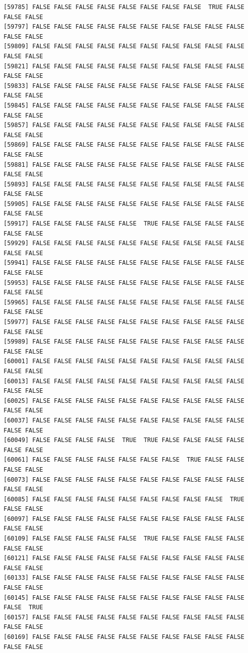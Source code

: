 \documentclass[
  a4paper,
  DIV=11,
  numbers=noendperiod]{scrartcl}
\begin{document}
\begin{verbatim}
[59785] FALSE FALSE FALSE FALSE FALSE FALSE FALSE FALSE  TRUE FALSE FALSE FALSE
[59797] FALSE FALSE FALSE FALSE FALSE FALSE FALSE FALSE FALSE FALSE FALSE FALSE
[59809] FALSE FALSE FALSE FALSE FALSE FALSE FALSE FALSE FALSE FALSE FALSE FALSE
[59821] FALSE FALSE FALSE FALSE FALSE FALSE FALSE FALSE FALSE FALSE FALSE FALSE
[59833] FALSE FALSE FALSE FALSE FALSE FALSE FALSE FALSE FALSE FALSE FALSE FALSE
[59845] FALSE FALSE FALSE FALSE FALSE FALSE FALSE FALSE FALSE FALSE FALSE FALSE
[59857] FALSE FALSE FALSE FALSE FALSE FALSE FALSE FALSE FALSE FALSE FALSE FALSE
[59869] FALSE FALSE FALSE FALSE FALSE FALSE FALSE FALSE FALSE FALSE FALSE FALSE
[59881] FALSE FALSE FALSE FALSE FALSE FALSE FALSE FALSE FALSE FALSE FALSE FALSE
[59893] FALSE FALSE FALSE FALSE FALSE FALSE FALSE FALSE FALSE FALSE FALSE FALSE
[59905] FALSE FALSE FALSE FALSE FALSE FALSE FALSE FALSE FALSE FALSE FALSE FALSE
[59917] FALSE FALSE FALSE FALSE FALSE  TRUE FALSE FALSE FALSE FALSE FALSE FALSE
[59929] FALSE FALSE FALSE FALSE FALSE FALSE FALSE FALSE FALSE FALSE FALSE FALSE
[59941] FALSE FALSE FALSE FALSE FALSE FALSE FALSE FALSE FALSE FALSE FALSE FALSE
[59953] FALSE FALSE FALSE FALSE FALSE FALSE FALSE FALSE FALSE FALSE FALSE FALSE
[59965] FALSE FALSE FALSE FALSE FALSE FALSE FALSE FALSE FALSE FALSE FALSE FALSE
[59977] FALSE FALSE FALSE FALSE FALSE FALSE FALSE FALSE FALSE FALSE FALSE FALSE
[59989] FALSE FALSE FALSE FALSE FALSE FALSE FALSE FALSE FALSE FALSE FALSE FALSE
[60001] FALSE FALSE FALSE FALSE FALSE FALSE FALSE FALSE FALSE FALSE FALSE FALSE
[60013] FALSE FALSE FALSE FALSE FALSE FALSE FALSE FALSE FALSE FALSE FALSE FALSE
[60025] FALSE FALSE FALSE FALSE FALSE FALSE FALSE FALSE FALSE FALSE FALSE FALSE
[60037] FALSE FALSE FALSE FALSE FALSE FALSE FALSE FALSE FALSE FALSE FALSE FALSE
[60049] FALSE FALSE FALSE FALSE  TRUE  TRUE FALSE FALSE FALSE FALSE FALSE FALSE
[60061] FALSE FALSE FALSE FALSE FALSE FALSE FALSE  TRUE FALSE FALSE FALSE FALSE
[60073] FALSE FALSE FALSE FALSE FALSE FALSE FALSE FALSE FALSE FALSE FALSE FALSE
[60085] FALSE FALSE FALSE FALSE FALSE FALSE FALSE FALSE FALSE  TRUE FALSE FALSE
[60097] FALSE FALSE FALSE FALSE FALSE FALSE FALSE FALSE FALSE FALSE FALSE FALSE
[60109] FALSE FALSE FALSE FALSE FALSE  TRUE FALSE FALSE FALSE FALSE FALSE FALSE
[60121] FALSE FALSE FALSE FALSE FALSE FALSE FALSE FALSE FALSE FALSE FALSE FALSE
[60133] FALSE FALSE FALSE FALSE FALSE FALSE FALSE FALSE FALSE FALSE FALSE FALSE
[60145] FALSE FALSE FALSE FALSE FALSE FALSE FALSE FALSE FALSE FALSE FALSE  TRUE
[60157] FALSE FALSE FALSE FALSE FALSE FALSE FALSE FALSE FALSE FALSE FALSE FALSE
[60169] FALSE FALSE FALSE FALSE FALSE FALSE FALSE FALSE FALSE FALSE FALSE FALSE

\end{verbatim}
\end{document}
